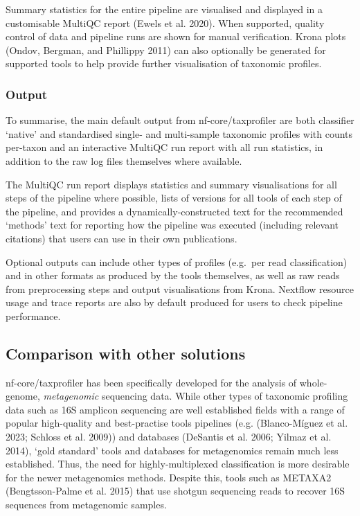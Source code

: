 \documentclass[
]{article}
\begin{document}
Summary statistics for the entire pipeline are visualised and displayed
in a customisable MultiQC report (Ewels et al. 2020). When supported,
quality control of data and pipeline runs are shown for manual
verification. Krona plots (Ondov, Bergman, and Phillippy 2011) can also
optionally be generated for supported tools to help provide further
visualisation of taxonomic profiles.

\hypertarget{output}{%
\subsubsection{Output}\label{output}}

To summarise, the main default output from nf-core/taxprofiler are both
classifier `native' and standardised single- and multi-sample taxonomic
profiles with counts per-taxon and an interactive MultiQC run report
with all run statistics, in addition to the raw log files themselves
where available.

The MultiQC run report displays statistics and summary visualisations
for all steps of the pipeline where possible, lists of versions for all
tools of each step of the pipeline, and provides a
dynamically-constructed text for the recommended `methods' text for
reporting how the pipeline was executed (including relevant citations)
that users can use in their own publications.

Optional outputs can include other types of profiles (e.g.~per read
classification) and in other formats as produced by the tools
themselves, as well as raw reads from preprocessing steps and output
visualisations from Krona. Nextflow resource usage and trace reports are
also by default produced for users to check pipeline performance.

\hypertarget{comparison-with-other-solutions}{%
\subsection{Comparison with other
solutions}\label{comparison-with-other-solutions}}

nf-core/taxprofiler has been specifically developed for the analysis of
whole-genome, \emph{metagenomic} sequencing data. While other types of
taxonomic profiling data such as 16S amplicon sequencing are well
established fields with a range of popular high-quality and
best-practise tools pipelines (e.g. (Blanco-Míguez et al. 2023; Schloss
et al. 2009)) and databases (DeSantis et al. 2006; Yilmaz et al. 2014),
`gold standard' tools and databases for metagenomics remain much less
established. Thus, the need for highly-multiplexed classification is
more desirable for the newer metagenomics methods. Despite this, tools
such as METAXA2 (Bengtsson-Palme et al. 2015) that use shotgun
sequencing reads to recover 16S sequences from metagenomic samples.
\end{document}
